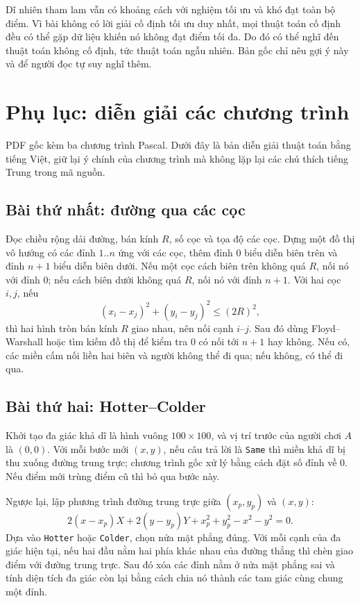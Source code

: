 \documentclass[11pt]{article}
\begin{document}
Dĩ nhiên tham lam vẫn có khoảng cách với nghiệm tối ưu và khó đạt toàn bộ
điểm. Vì bài không có lời giải cố định tối ưu duy nhất, mọi thuật toán cố định
đều có thể gặp dữ liệu khiến nó không đạt điểm tối đa. Do đó có thể nghĩ đến
thuật toán không cố định, tức thuật toán ngẫu nhiên. Bản gốc chỉ nêu gợi ý này
và để người đọc tự suy nghĩ thêm.

\section{Phụ lục: diễn giải các chương trình}

PDF gốc kèm ba chương trình Pascal. Dưới đây là bản diễn giải thuật toán bằng
tiếng Việt, giữ lại ý chính của chương trình mà không lặp lại các chú thích
tiếng Trung trong mã nguồn.

\subsection{Bài thứ nhất: đường qua các cọc}

Đọc chiều rộng dải đường, bán kính \(R\), số cọc và tọa độ các cọc. Dựng một
đồ thị vô hướng có các đỉnh \(1..n\) ứng với các cọc, thêm đỉnh \(0\) biểu
diễn biên trên và đỉnh \(n+1\) biểu diễn biên dưới. Nếu một cọc cách biên trên
không quá \(R\), nối nó với đỉnh \(0\); nếu cách biên dưới không quá \(R\),
nối nó với đỉnh \(n+1\). Với hai cọc \(i,j\), nếu
\[
  (x_i-x_j)^2+(y_i-y_j)^2 \le (2R)^2,
\]
thì hai hình tròn bán kính \(R\) giao nhau, nên nối cạnh \(i\)--\(j\).
Sau đó dùng Floyd--Warshall hoặc tìm kiếm đồ thị để kiểm tra \(0\) có nối tới
\(n+1\) hay không. Nếu có, các miền cấm nối liền hai biên và người không thể
đi qua; nếu không, có thể đi qua.

\subsection{Bài thứ hai: Hotter--Colder}

Khởi tạo đa giác khả dĩ là hình vuông \(100\times100\), và vị trí trước của
người chơi \(A\) là \((0,0)\). Với mỗi bước mới \((x,y)\), nếu câu trả lời là
\texttt{Same} thì miền khả dĩ bị thu xuống đường trung trực; chương trình gốc
xử lý bằng cách đặt số đỉnh về \(0\). Nếu điểm mới trùng điểm cũ thì bỏ qua
bước này.

Ngược lại, lập phương trình đường trung trực giữa \((x_p,y_p)\) và \((x,y)\):
\[
  2(x-x_p)X+2(y-y_p)Y+x_p^2+y_p^2-x^2-y^2=0.
\]
Dựa vào \texttt{Hotter} hoặc \texttt{Colder}, chọn nửa mặt phẳng đúng. Với
mỗi cạnh của đa giác hiện tại, nếu hai đầu nằm hai phía khác nhau của đường
thẳng thì chèn giao điểm với đường trung trực. Sau đó xóa các đỉnh nằm ở nửa
mặt phẳng sai và tính diện tích đa giác còn lại bằng cách chia nó thành các
tam giác cùng chung một đỉnh.
\end{document}
